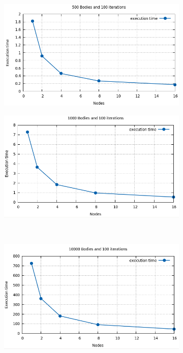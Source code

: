 \documentclass[a4paper]{article}
\begin{document}
\begin{figure}[ht]
\begin{subfigure}{.5\textwidth}
  \centering
  \includegraphics[width=1\linewidth]{results/500_100}
\end{subfigure} %
\begin{subfigure}{.5\textwidth}
  \centering
  \includegraphics[width=1\linewidth]{results/1000_100}
\end{subfigure} \\ %
\begin{subfigure}{.5\textwidth}
  \centering
  \includegraphics[width=1\linewidth]{results/10000_100}

\end{subfigure}
\end{figure}
\end{document}
